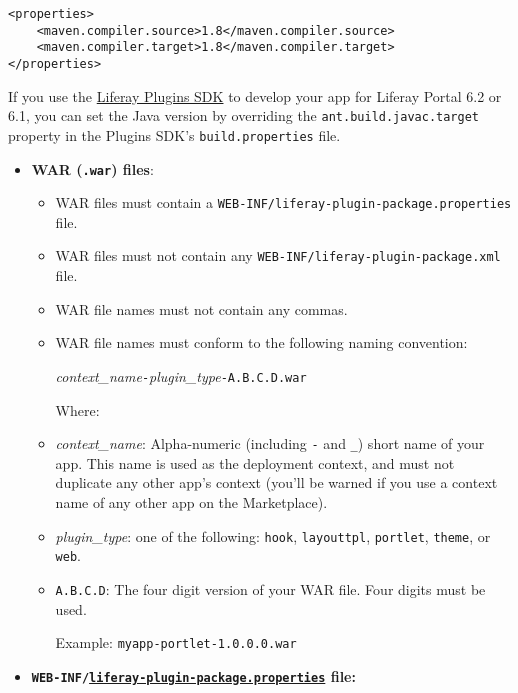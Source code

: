 \begin{verbatim}
<properties>
    <maven.compiler.source>1.8</maven.compiler.source>
    <maven.compiler.target>1.8</maven.compiler.target>  
</properties>
\end{verbatim}

If you use the
\href{/docs/6-2/tutorials/-/knowledge_base/t/plugins-sdk}{Liferay
Plugins SDK} to develop your app for Liferay Portal 6.2 or 6.1, you can
set the Java version by overriding the \texttt{ant.build.javac.target}
property in the Plugins SDK's \texttt{build.properties} file.

\begin{itemize}
\tightlist
\item
  \textbf{WAR (\texttt{.war}) files}:

  \begin{itemize}
  \item
    WAR files must contain a
    \texttt{WEB-INF/liferay-plugin-package.properties} file.
  \item
    WAR files must not contain any
    \texttt{WEB-INF/liferay-plugin-package.xml} file.
  \item
    WAR file names must not contain any commas.
  \item
    WAR file names must conform to the following naming convention:

    \emph{context\_name}\texttt{-}\emph{plugin\_type}\texttt{-A.B.C.D.war}

    Where:
  \item
    \emph{context\_name}: Alpha-numeric (including \texttt{-} and
    \texttt{\_}) short name of your app. This name is used as the
    deployment context, and must not duplicate any other app's context
    (you'll be warned if you use a context name of any other app on the
    Marketplace).
  \item
    \emph{plugin\_type}: one of the following: \texttt{hook},
    \texttt{layouttpl}, \texttt{portlet}, \texttt{theme}, or
    \texttt{web}.
  \item
    \texttt{A.B.C.D}: The four digit version of your WAR file. Four
    digits must be used.

    Example: \texttt{myapp-portlet-1.0.0.0.war}
  \end{itemize}
\item
  \textbf{\texttt{WEB-INF/}\href{https://docs.liferay.com/ce/portal/7.1-latest/propertiesdoc/liferay-plugin-package_7_1_0.properties.html}{\texttt{liferay-plugin-package.properties}}
  file:}


\end{itemize}
